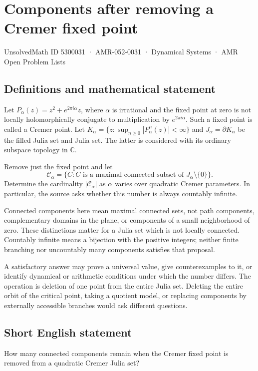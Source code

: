 \documentclass[11pt,a4paper]{article}
\begin{document}
\section*{Components after removing a Cremer fixed point}\label{5300031}
{\small UnsolvedMath ID 5300031 · AMR-052-0031 · Dynamical Systems · AMR Open Problem Lists}
\subsection{Definitions and mathematical statement}
Let $P_\alpha(z)=z^2+e^{2\pi i\alpha}z$, where $\alpha$ is irrational
and the fixed point at zero is not locally holomorphically conjugate
to multiplication by $e^{2\pi i\alpha}$. Such a fixed point is called
a Cremer point. Let
$K_\alpha=\{z:\sup_{n\ge0}|P_\alpha^n(z)|<\infty\}$ and
$J_\alpha=\partial K_\alpha$ be the filled Julia set and Julia set.
The latter is considered with its ordinary subspace topology in
$\mathbb C$.

Remove just the fixed point and let
\[
 \mathcal C_\alpha=\{C:C\text{ is a maximal connected subset of }
                                  J_\alpha\setminus\{0\}\}.
\]
Determine the cardinality $|\mathcal C_\alpha|$ as $\alpha$ varies over
quadratic Cremer parameters. In particular, the source asks whether
this number is always countably infinite.

Connected components here mean maximal connected sets, not path
components, complementary domains in the plane, or components of a
small neighborhood of zero. These distinctions matter for a Julia set
which is not locally connected. Countably infinite means a bijection
with the positive integers; neither finite branching nor uncountably
many components satisfies that proposal.

A satisfactory answer may prove a universal value, give counterexamples
to it, or identify dynamical or arithmetic conditions under which the
number differs. The operation is deletion of one point from the entire
Julia set. Deleting the entire orbit of the critical point, taking a
quotient model, or replacing components by externally accessible
branches would ask different questions.
\subsection{Short English statement}
How many connected components remain when the Cremer fixed point is removed from a quadratic Cremer Julia set?
\end{document}

